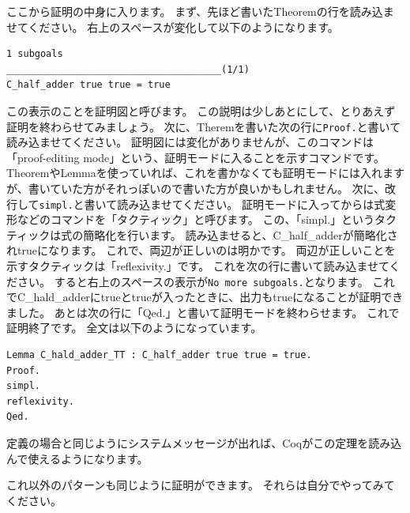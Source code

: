 \documentclass{jsbook}
\begin{document}
ここから証明の中身に入ります。
まず、先ほど書いたTheoremの行を読み込ませてください。
右上のスペースが変化して以下のようになります。
\begin{verbatim}
1 subgoals
______________________________________(1/1)
C_half_adder true true = true
\end{verbatim}
この表示のことを証明図と呼びます。
この説明は少しあとにして、とりあえず証明を終わらせてみましょう。
次に、Theremを書いた次の行に\verb|Proof.|と書いて読み込ませてください。
証明図には変化がありませんが、このコマンドは「proof-editing mode」という、証明モードに入ることを示すコマンドです。
TheoremやLemmaを使っていれば、これを書かなくても証明モードには入れますが、書いていた方がそれっぽいので書いた方が良いかもしれません。
次に、改行して\verb|simpl.|と書いて読み込ませてください。
証明モードに入ってからは式変形などのコマンドを「タクティック」と呼びます。
この、「simpl.」というタクティックは式の簡略化を行います。
読み込ませると、C\_half\_adderが簡略化されtrueになります。
これで、両辺が正しいのは明かです。
両辺が正しいことを示すタクティックは「reflexivity.」です。
これを次の行に書いて読み込ませてください。
すると右上のスペースの表示が\verb|No more subgoals.|となります。
これでC\_hald\_adderにtrueとtrueが入ったときに、出力もtrueになることが証明できました。
あとは次の行に「Qed.」と書いて証明モードを終わらせます。
これで証明終了です。
全文は以下のようになっています。
\begin{verbatim}
Lemma C_hald_adder_TT : C_half_adder true true = true.
Proof.
simpl.
reflexivity.
Qed.
\end{verbatim}
定義の場合と同じようにシステムメッセージが出れば、Coqがこの定理を読み込んで使えるようになります。

これ以外のパターンも同じように証明ができます。
それらは自分でやってみてください。
\end{document}

